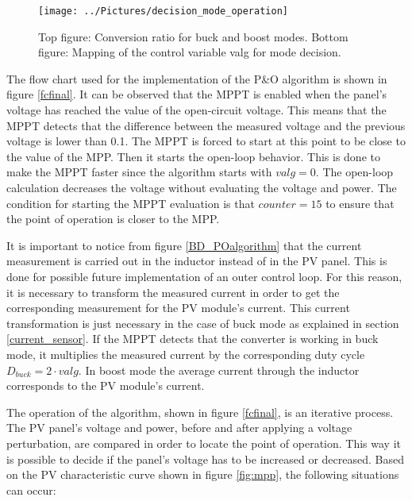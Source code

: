 \begin{figure}[H]
	\begin{center}
		\texttt{[image: ../Pictures/decision\_mode\_operation]}
		\caption{Top figure: Conversion ratio for buck and boost modes. Bottom figure: Mapping of the control variable valg for mode decision.}
		\label{fig:mappingtf} 
	\end{center}	
\end{figure}

The flow chart used for the implementation of the P\&O algorithm is shown in figure \ref{fcfinal}. It can be observed that the MPPT is enabled when the panel's voltage has reached the value of the open-circuit voltage. This means that the MPPT detects that the difference between the measured voltage and the previous voltage is lower than 0.1. The MPPT is forced to start at this point to be close to the value of the MPP. 
Then it starts the open-loop behavior. This is done to make the MPPT faster since the algorithm starts with $valg = 0$. The open-loop calculation decreases the voltage without evaluating the voltage and power. The condition for starting the MPPT evaluation is that $counter=15$ to ensure that the point of operation is closer to the MPP. 

It is important to notice from figure \ref{BD_POalgorithm} that the current measurement is carried out in the inductor instead of in the PV panel. This is done for possible future implementation of an outer control loop. For this reason, it is necessary to transform the measured current in order to get the corresponding measurement for the PV module's current. This current transformation is just necessary in the case of buck mode as explained in section \ref{current_sensor}. If the MPPT detects that the converter is working in buck mode, it multiplies the measured current by the corresponding duty cycle $D_{buck}=2\cdot valg$. In boost mode the average current through the inductor corresponds to the PV module's current. 

The operation of the algorithm, shown in figure \ref{fcfinal}, is an iterative process. The PV panel's voltage and power, before and after applying a voltage perturbation, are compared  in order to locate the point of operation. This way it is possible to decide if the panel's voltage has to be increased or decreased. Based on the PV characteristic curve shown in figure \ref{fig:mpp}, the following situations can occur:

